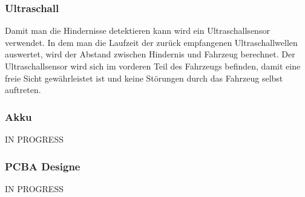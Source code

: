 \subsubsection{Ultraschall}

Damit man die Hindernisse detektieren kann wird ein Ultraschallsensor verwendet. In dem man die Laufzeit der zurück empfangenen Ultraschallwellen auswertet, wird der Abstand zwischen Hindernis und Fahrzeug berechnet. Der Ultraschallsensor wird sich im vorderen Teil des Fahrzeugs befinden, damit eine freie Sicht gewährleistet ist und keine Störungen durch das Fahrzeug selbst auftreten.

\subsubsection{Akku}

IN PROGRESS

\subsubsection{PCBA Designe}

IN PROGRESS